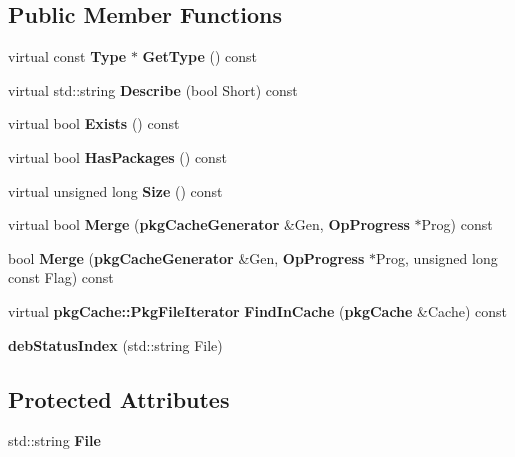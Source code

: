 \subsection*{\-Public \-Member \-Functions}
\begin{DoxyCompactItemize}
\item 
virtual const {\bf \-Type} $\ast$ {\bfseries \-Get\-Type} () const \label{classdebStatusIndex_a97e9791ce2bb129d7b03dfe2f55de366}

\item 
virtual std\-::string {\bfseries \-Describe} (bool \-Short) const \label{classdebStatusIndex_aa556154018c8e1cb5b4492198696e5f6}

\item 
virtual bool {\bfseries \-Exists} () const \label{classdebStatusIndex_aa746a17c5bebccb81d72dccb29948ec4}

\item 
virtual bool {\bfseries \-Has\-Packages} () const \label{classdebStatusIndex_a3529b24d8d4f049bd120b93d56d467d0}

\item 
virtual unsigned long {\bfseries \-Size} () const \label{classdebStatusIndex_ab1050fe2604ef4e6cba6491de8a9f708}

\item 
virtual bool {\bfseries \-Merge} ({\bf pkg\-Cache\-Generator} \&\-Gen, {\bf \-Op\-Progress} $\ast$\-Prog) const \label{classdebStatusIndex_a7055ce0e05b5bcf6fad25971d5e3c9e4}

\item 
bool {\bfseries \-Merge} ({\bf pkg\-Cache\-Generator} \&\-Gen, {\bf \-Op\-Progress} $\ast$\-Prog, unsigned long const \-Flag) const \label{classdebStatusIndex_a53a5348cded6b4220e9258dee8cb4a8d}

\item 
virtual {\bf pkg\-Cache\-::\-Pkg\-File\-Iterator} {\bfseries \-Find\-In\-Cache} ({\bf pkg\-Cache} \&\-Cache) const \label{classdebStatusIndex_afa0e20f879d9090dac2a7a4830bc7015}

\item 
{\bfseries deb\-Status\-Index} (std\-::string \-File)\label{classdebStatusIndex_a240905e240bb9a1e170da8d88cb1df99}

\end{DoxyCompactItemize}
\subsection*{\-Protected \-Attributes}
\begin{DoxyCompactItemize}
\item 
std\-::string {\bfseries \-File}\label{classdebStatusIndex_ab132f933cf66d57c099dc6226d631deb}

\end{DoxyCompactItemize}


